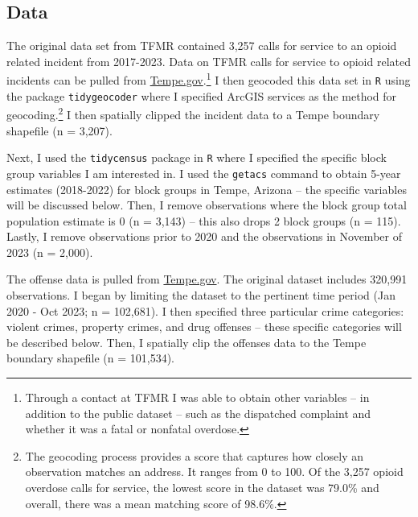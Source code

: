 \subsection{Data}
The original data set from TFMR contained 3,257 calls for service to an opioid related incident from 2017-2023. Data on TFMR calls for service to opioid related incidents can be pulled from \href{https://data.tempe.gov/datasets/2daeeafd2741494c8294ca415e5a793e_0/explore?location=33.398962%2C-111.931850%2C11.94}{Tempe.gov}.\footnote{Through a contact at TFMR I was able to obtain other variables -- in addition to the public dataset -- such as the dispatched complaint and whether it was a fatal or nonfatal overdose.} I then geocoded this data set in \texttt{R} using the package \texttt{tidygeocoder} where I specified ArcGIS services as the method for geocoding.\footnote{The geocoding process provides a score that captures how closely an observation matches an address. It ranges from 0 to 100. Of the 3,257 opioid overdose calls for service, the lowest score in the dataset was 79.0\% and overall, there was a mean matching score of 98.6\%.} I then spatially clipped the incident data to a Tempe boundary shapefile (n = 3,207). 

Next, I used the \texttt{tidycensus} package in \texttt{R} where I specified the specific block group variables I am interested in. I used the \texttt{getacs} command to obtain 5-year estimates (2018-2022) for block groups in Tempe, Arizona -- the specific variables will be discussed below. Then, I remove observations where the block group total population estimate is 0 (n = 3,143) -- this also drops 2 block groups (n = 115). Lastly, I remove observations prior to 2020 and the observations in November of 2023 (n = 2,000). 

The offense data is pulled from \href{https://data.tempe.gov/datasets/1563be5b343b4f78b1163e97a9a503ad_0/explore?location=32.279019%2C-112.767075%2C7.97}{Tempe.gov}. The original dataset includes 320,991 observations. I began by limiting the dataset to the pertinent time period (Jan 2020 - Oct 2023; n = 102,681). I then specified three particular crime categories: violent crimes, property crimes, and drug offenses -- these specific categories will be described below. Then, I spatially clip the offenses data to the Tempe boundary shapefile (n = 101,534). 

